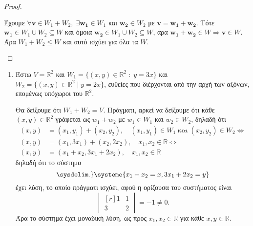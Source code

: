 \begin{proof}
\begin{myitemize}
        Έχουμε $ \forall \mathbf{v} \in W_{1} + W_{2}, \; \exists \mathbf{w_{1}} 
        \in W_{1}  $ και $ \mathbf{w_{2}} \in W_{2} $ με $ \mathbf{v} = 
        \mathbf{w_{1}}+ \mathbf{w_{2}} $.  Τότε $ \mathbf{w_{1}} \in W_{1} \cup W_{2} 
        \subseteq W $
        και όμοια $ \mathbf{w_{2}} \in W_{1} \cup W_{2} \subseteq W $, άρα 
        $ \mathbf{w_{1}}+ \mathbf{w_{2}} \in W \Rightarrow \mathbf{v} \in W $. 
        Άρα $ W_{1}+W_{2} \leq W $ 
        και αυτό ισχύει για όλα τα $W$. 
    \end{myitemize}
\end{proof} 

\begin{examples}
\item {}
    \begin{enumerate}
        \item \label{ex:r2} Έστω $ V = \mathbb{R}^{2} $ και $ W_{1} = 
            \{(x,y)\in \mathbb{R}^{2} \; : \; y =3x \} $ και 
            $ W_{2} = \{(x,y)\in \mathbb{R}^{2} \mid y=2x \} $, ευθείες που διέρχονται 
            από την αρχή των αξόνων, επομένως υπόχωροι του $ \mathbb{R}^{2}$. 

            Θα δείξουμε ότι $ W_{1}+W_{2} = V $. Πράγματι, αρκεί να δείξουμε ότι 
            κάθε $ (x,y) \in \mathbb{R}^{2} $ γράφεται ως $ w_{1}+w_{2} $ με 
            $ w_{1} \in W_{1} $ και $ w_{2} \in W_{2} $, δηλαδή ότι 
            \begin{align*}
                (x,y) &= (x_{1}, y_{1}) + (x_{2}, y_{2}), \quad (x_{1}, y_{1}) 
                \in W_{1} \; \text{και} \; (x_{2}, y_{2}) \in W_{2}
                \Leftrightarrow \\
                (x,y) &= (x_{1}, 3x_{1}) + (x_{2}, 2x_{2}), \quad x_{1}, x_{2} 
                \in \mathbb{R} \Leftrightarrow \\
                (x,y) &= (x_{1}+ x_{2}, 3x_{1}+ 2x_{2}), \quad x_{1}, x_{2} 
                \in \mathbb{R} 
            \end{align*}
            δηλαδή ότι το σύστημα 
            \[
            \sysdelim.\}\systeme{x_{1} + x_{2}=x,3x_{1} + 2x_{2}= y} 
        \] 
        έχει λύση, το οποίο πράγματι ισχύει, αφού η ορίζουσα του συστήματος είναι 
        \[
            \begin{vmatrix*}[r]
                1 & 1 \\
                3 & 2
            \end{vmatrix*} = -1 \neq 0.
        \]
        Άρα το σύστημα έχει μοναδική λύση, ως προς $ x_{1}, x_{2} \in \mathbb{R} $ 
        για κάθε $ x, y \in \mathbb{R} $.


\end{enumerate}
\end{examples}

